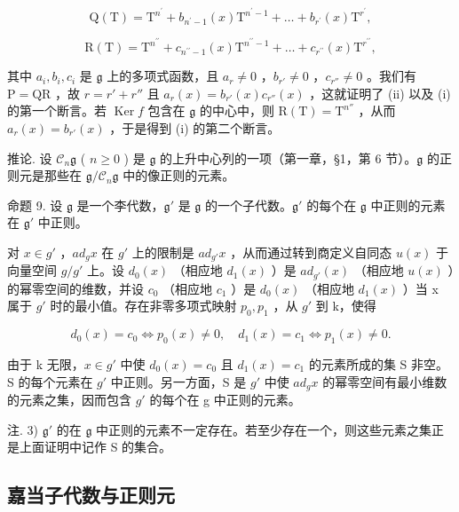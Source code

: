 \[
\mathrm{Q} (\mathrm{T}) = \mathrm{T} ^ {n ^ {\prime}} + b _ {n ^ {\prime} - 1} (x) \mathrm{T} ^ {n ^ {\prime} - 1} + \dots + b _ {r ^ {\prime}} (x) \mathrm{T} ^ {r ^ {\prime}},
\]

\[
\mathrm{R} (\mathrm{T}) = \mathrm{T} ^ {n ^ {\prime \prime}} + c _ {n ^ {\prime \prime} - 1} (x) \mathrm{T} ^ {n ^ {\prime \prime} - 1} + \dots + c _ {r ^ {\prime \prime}} (x) \mathrm{T} ^ {r ^ {\prime \prime}},
\]

其中 \(a_i, b_i, c_i\) 是 \(\mathfrak{g}\) 上的多项式函数，且 \(a_r \neq 0\) ，\(b_{r'} \neq 0\) ，\(c_{r''} \neq 0\) 。我们有 \(\mathrm{P} = \mathrm{QR}\) ，故 \(r = r' + r''\) 且 \(a_r(x) = b_{r'}(x)c_{r''}(x)\) ，这就证明了 (ii) 以及 (i) 的第一个断言。若 \(\operatorname{Ker} f\) 包含在 \(\mathfrak{g}\) 的中心中，则 \(\mathrm{R(T)} = \mathrm{T}^{n''}\) ，从而 \(a_r(x) = b_{r'}(x)\) ，于是得到 (i) 的第二个断言。

推论. 设 \(\mathcal{C}_n\mathfrak{g}\) ( \(n \geq 0\) ) 是 \(\mathfrak{g}\) 的上升中心列的一项（第一章，§1，第 6 节）。\(\mathfrak{g}\) 的正则元是那些在 \(\mathfrak{g}/\mathcal{C}_n\mathfrak{g}\) 中的像正则的元素。

命题 9. 设 \(\mathfrak{g}\) 是一个李代数，\(\mathfrak{g}'\) 是 \(\mathfrak{g}\) 的一个子代数。\(\mathfrak{g}'\) 的每个在 \(\mathfrak{g}\) 中正则的元素在 \(\mathfrak{g}'\) 中正则。

对 \(x \in g'\) ，\(ad_{g}x\) 在 \(g'\) 上的限制是 \(ad_{g'}x\) ，从而通过转到商定义自同态 \(u(x)\) 于向量空间 \(g/g'\) 上。设 \(d_{0}(x)\) （相应地 \(d_{1}(x)\) ）是 \(ad_{g'}(x)\) （相应地 \(u(x)\) ）的幂零空间的维数，并设 \(c_{0}\) （相应地 \(c_{1}\) ）是 \(d_{0}(x)\) （相应地 \(d_{1}(x)\) ）当 x 属于 \(g'\) 时的最小值。存在非零多项式映射 \(p_{0}, p_{1}\) ，从 \(g'\) 到 k，使得

\[
d _ {0} (x) = c _ {0} \Longleftrightarrow p _ {0} (x) \neq 0, \quad d _ {1} (x) = c _ {1} \Longleftrightarrow p _ {1} (x) \neq 0.
\]

由于 k 无限，\(x \in g'\) 中使 \(d_{0}(x) = c_{0}\) 且 \(d_{1}(x) = c_{1}\) 的元素所成的集 S 非空。S 的每个元素在 \(g'\) 中正则。另一方面，S 是 \(g'\) 中使 \(ad_{g}x\) 的幂零空间有最小维数的元素之集，因而包含 \(g'\) 的每个在 g 中正则的元素。

注. 3) \(\mathfrak{g}'\) 的在 \(\mathfrak{g}\) 中正则的元素不一定存在。若至少存在一个，则这些元素之集正是上面证明中记作 S 的集合。

\subsection{嘉当子代数与正则元}


